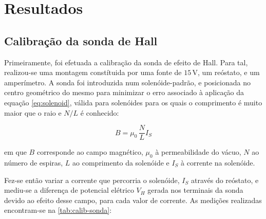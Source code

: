 \section{Resultados}

\subsection{Calibração da sonda de Hall}

Primeiramente, foi efetuada a calibração da sonda de efeito de Hall. Para tal, realizou-se uma montagem constítuida por uma fonte de $15 \, \unit{\volt}$, um reóstato, e um amperímetro. A sonda foi introduzida num solenóide-padrão, e posicionada no centro geométrico do mesmo para minimizar o erro associado à aplicação da equação \cref{eq:solenoid}, válida para solenóides para os quais o comprimento é muito maior que o raio e $N/L$ é conhecido:

\begin{equation}
	B = \mu_0 \, \frac{N}{L}I_S
	\label{eq:solenoid}
\end{equation}

em que $B$ corresponde ao campo magnético, $\mu_0$ à permeabilidade do vácuo, $N$ ao número de espiras, $L$ ao comprimento da solenóide e $I_S$ à corrente na solenóide.

Fez-se então variar a corrente que percorria o solenóide, $I_S$ através do reóstato, e mediu-se a diferença de potencial elétrico $V_H$ gerada nos terminais da sonda devido ao efeito desse campo, para cada valor de corrente. As medições  realizadas encontram-se na \cref{tab:calib-sonda}:


\begin{table}[!ht]
	\centering
	\caption{Tensão de Hall e corrente na solenóide medidas.}
	\label{tab:calib-sonda}
\end{table}


